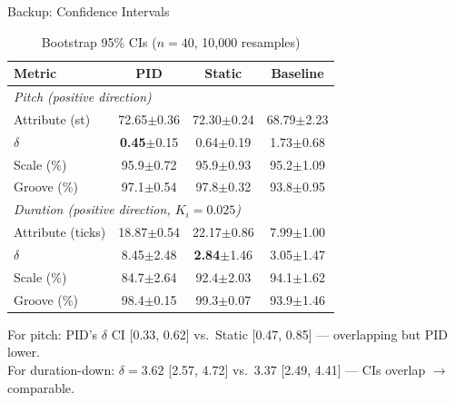 \documentclass[aspectratio=169, 11pt]{beamer}
\begin{document}
\begin{frame}[noframenumbering]{Backup: Confidence Intervals}

\begin{table}
\centering\small
\caption*{Bootstrap 95\% CIs ($n{=}40$, 10,000 resamples)}
\begin{tabular}{lccc}
  \toprule
  Metric & PID & Static & Baseline \\
  \midrule
  \multicolumn{4}{l}{\textit{Pitch (positive direction)}} \\
  Attribute (st) & 72.65$\pm$0.36 & 72.30$\pm$0.24 & 68.79$\pm$2.23 \\
  $\delta$ & \textbf{0.45}$\pm$0.15 & 0.64$\pm$0.19 & 1.73$\pm$0.68 \\
  Scale (\%) & 95.9$\pm$0.72 & 95.9$\pm$0.93 & 95.2$\pm$1.09 \\
  Groove (\%) & 97.1$\pm$0.54 & 97.8$\pm$0.32 & 93.8$\pm$0.95 \\
  \midrule
  \multicolumn{4}{l}{\textit{Duration (positive direction, $K_i{=}0.025$)}} \\
  Attribute (ticks) & 18.87$\pm$0.54 & 22.17$\pm$0.86 & 7.99$\pm$1.00 \\
  $\delta$ & 8.45$\pm$2.48 & \textbf{2.84}$\pm$1.46 & 3.05$\pm$1.47 \\
  Scale (\%) & 84.7$\pm$2.64 & 92.4$\pm$2.03 & 94.1$\pm$1.62 \\
  Groove (\%) & 98.4$\pm$0.15 & 99.3$\pm$0.07 & 93.9$\pm$1.46 \\
  \bottomrule
\end{tabular}
\end{table}

{\small For pitch: PID's $\delta$ CI [0.33, 0.62] vs.\ Static [0.47, 0.85] --- overlapping but PID lower.\\
For duration-down: $\delta{=}3.62$ [2.57, 4.72] vs.\ $3.37$ [2.49, 4.41] --- CIs overlap $\to$ comparable.}
\end{frame}
\end{document}
